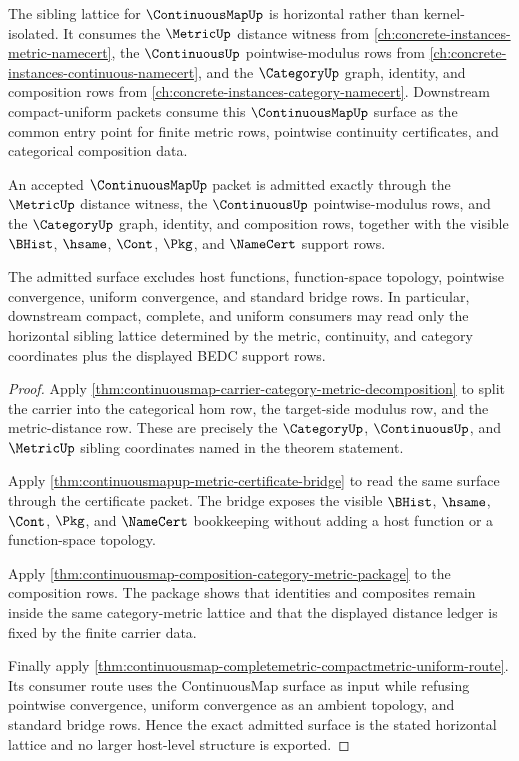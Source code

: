 The sibling lattice for $\ContinuousMapUp$ is horizontal rather than
kernel-isolated. It consumes the $\MetricUp$ distance witness from
\autoref{ch:concrete-instances-metric-namecert}, the $\ContinuousUp$
pointwise-modulus rows from
\autoref{ch:concrete-instances-continuous-namecert}, and the $\CategoryUp$
graph, identity, and composition rows from
\autoref{ch:concrete-instances-category-namecert}. Downstream
compact-uniform packets consume this $\ContinuousMapUp$ surface as the common
entry point for finite metric rows, pointwise continuity certificates, and
categorical composition data.

\begin{theorem}
\label{thm:continuousmap-sibling-lattice-exactness}
An accepted $\ContinuousMapUp$ packet is admitted exactly through the
$\MetricUp$ distance witness, the $\ContinuousUp$ pointwise-modulus rows, and
the $\CategoryUp$ graph, identity, and composition rows, together with the
visible $\BHist$, $\hsame$, $\Cont$, $\Pkg$, and $\NameCert$ support rows.

The admitted surface excludes host functions, function-space topology,
pointwise convergence, uniform convergence, and standard bridge rows. In
particular, downstream compact, complete, and uniform consumers may read only
the horizontal sibling lattice determined by the metric, continuity, and
category coordinates plus the displayed BEDC support rows.
\end{theorem}
\begin{proof}
Apply
\autoref{thm:continuousmap-carrier-category-metric-decomposition} to split the
carrier into the categorical hom row, the target-side modulus row, and the
metric-distance row. These are precisely the $\CategoryUp$, $\ContinuousUp$,
and $\MetricUp$ sibling coordinates named in the theorem statement.

Apply \autoref{thm:continuousmapup-metric-certificate-bridge} to read the same
surface through the certificate packet. The bridge exposes the visible
$\BHist$, $\hsame$, $\Cont$, $\Pkg$, and $\NameCert$ bookkeeping without adding
a host function or a function-space topology.

Apply
\autoref{thm:continuousmap-composition-category-metric-package} to the
composition rows. The package shows that identities and composites remain
inside the same category-metric lattice and that the displayed distance ledger
is fixed by the finite carrier data.

Finally apply
\autoref{thm:continuousmap-completemetric-compactmetric-uniform-route}. Its
consumer route uses the ContinuousMap surface as input while refusing
pointwise convergence, uniform convergence as an ambient topology, and
standard bridge rows. Hence the exact admitted surface is the stated
horizontal lattice and no larger host-level structure is exported.
\end{proof}
